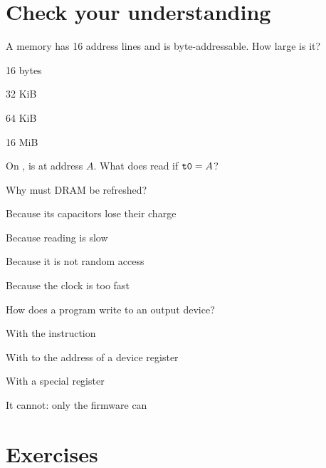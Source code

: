 

\section{Check your understanding}

\begin{quiz}{A memory has 16 address lines and is byte-addressable. How large is it?}
\item 16 bytes
\item 32 KiB
\item 64 KiB
\item 16 MiB
\end{quiz}

\begin{quiz}{On \riscv,  is at address $A$. What does  read if $\texttt{t0}=A$?}
\item {}
\item {}
\item {}
\item {}
\end{quiz}

\begin{quiz}{Why must DRAM be refreshed?}
\item Because its capacitors lose their charge
\item Because reading is slow
\item Because it is not random access
\item Because the clock is too fast
\end{quiz}

\begin{quiz}{How does a \riscv program write to an output device?}
\item With the  instruction
\item With  to the address of a device register
\item With a special register 
\item It cannot: only the firmware can
\end{quiz}

\section{Exercises}

